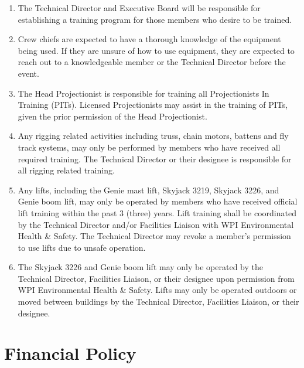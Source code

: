 \documentclass[12pt,letterpaper,oneside]{book}
\begin{document}
\begin{enumerate}

\item The Technical Director and Executive Board will be responsible for establishing a training program for those members who desire to be trained.
\item Crew chiefs are expected to have a thorough knowledge of the equipment being used. If they are unsure of how to use equipment, they are expected to reach out to a knowledgeable member or the Technical Director before the event.
\item The Head Projectionist is responsible for training all Projectionists In Training (PITs).
Licensed Projectionists may assist in the training of PITs, given the prior permission of the Head Projectionist.
\item Any rigging related activities including truss, chain motors, battens and fly track systems, may only be performed by members who have received all required training. The Technical Director or their designee is responsible for all rigging related training.
\item Any lifts, including the Genie mast lift, Skyjack 3219, Skyjack 3226, and Genie boom lift, may only be operated by members who have received official lift training within the past 3 (three) years. Lift training shall be coordinated by the Technical Director and/or Facilities Liaison with WPI Environmental Health \& Safety. The Technical Director may revoke a member's permission to use lifts due to unsafe operation.
\item The Skyjack 3226 and Genie boom lift may only be operated by the Technical Director, Facilities Liaison, or their designee upon permission from WPI Environmental Health \& Safety. Lifts may only be operated outdoors or moved between buildings by the Technical Director, Facilities Liaison, or their designee.

\end{enumerate}

\section{Financial Policy}
\end{document}
